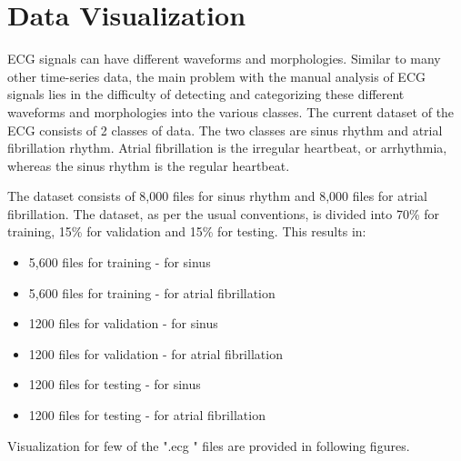 \clearpage
\section{Data Visualization}
\label{sec:data_visulization}
ECG signals can have different waveforms and morphologies. Similar to many other time-series data, the main problem with the manual analysis of ECG signals lies in the difficulty of detecting and categorizing these different waveforms and morphologies into the various classes. The current dataset of the ECG consists of 2 classes of data. The two classes are sinus rhythm and atrial fibrillation rhythm. Atrial fibrillation is the irregular heartbeat, or arrhythmia, whereas the sinus rhythm is the regular heartbeat.

The dataset consists of 8,000 files for sinus rhythm and 8,000 files for atrial fibrillation. The dataset, as per the usual conventions, is divided into 70\% for training, 15\% for validation and 15\% for testing. This results in:
\begin{itemize}
    \item 5,600 files for training - for sinus
    \item 5,600 files for training - for atrial fibrillation
    \item 1200 files for validation - for sinus
    \item 1200 files for validation - for atrial fibrillation
    \item 1200 files for testing - for sinus
    \item 1200 files for testing - for atrial fibrillation
\end{itemize}

Visualization for few of the ".ecg " files are provided in following figures.

